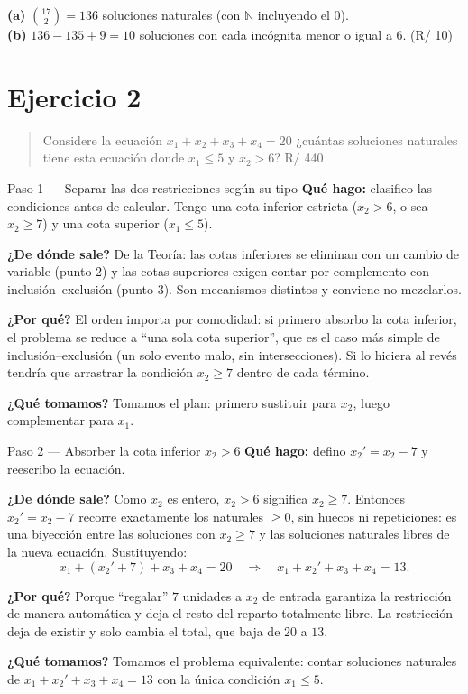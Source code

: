 \documentclass[11pt]{article}
\begin{document}
\begin{resp}
\textbf{(a)} $\binom{17}{2}=136$ soluciones naturales (con $\mathbb{N}$ incluyendo el $0$).\\
\textbf{(b)} $136-135+9=10$ soluciones con cada incógnita menor o igual a $6$. \hfill (R/ 10)
\end{resp}

\section*{Ejercicio 2}

\begin{quote}
Considere la ecuación $x_1+x_2+x_3+x_4=20$ ¿cuántas soluciones naturales tiene esta ecuación donde
$x_1\le 5$ y $x_2>6$? \hfill R/ 440
\end{quote}

\begin{paso}{Paso 1 --- Separar las dos restricciones según su tipo}
\textbf{Qué hago:} clasifico las condiciones antes de calcular. Tengo una cota inferior estricta
($x_2>6$, o sea $x_2\ge 7$) y una cota superior ($x_1\le 5$).

\textbf{¿De dónde sale?} De la Teoría: las cotas inferiores se eliminan con un cambio de variable
(punto 2) y las cotas superiores exigen contar por complemento con inclusión--exclusión (punto 3).
Son mecanismos distintos y conviene no mezclarlos.

\textbf{¿Por qué?} El orden importa por comodidad: si primero absorbo la cota inferior, el problema se
reduce a ``una sola cota superior'', que es el caso más simple de inclusión--exclusión (un solo evento
malo, sin intersecciones). Si lo hiciera al revés tendría que arrastrar la condición $x_2\ge 7$ dentro
de cada término.

\textbf{¿Qué tomamos?} Tomamos el plan: primero sustituir para $x_2$, luego complementar para $x_1$.
\end{paso}

\begin{paso}{Paso 2 --- Absorber la cota inferior $x_2>6$}
\textbf{Qué hago:} defino $x_2'=x_2-7$ y reescribo la ecuación.

\textbf{¿De dónde sale?} Como $x_2$ es entero, $x_2>6$ significa $x_2\ge 7$. Entonces $x_2'=x_2-7$
recorre exactamente los naturales $\ge 0$, sin huecos ni repeticiones: es una biyección entre las
soluciones con $x_2\ge 7$ y las soluciones naturales libres de la nueva ecuación. Sustituyendo:
\[
x_1+(x_2'+7)+x_3+x_4=20 \quad\Longrightarrow\quad x_1+x_2'+x_3+x_4=13.
\]

\textbf{¿Por qué?} Porque ``regalar'' $7$ unidades a $x_2$ de entrada garantiza la restricción de
manera automática y deja el resto del reparto totalmente libre. La restricción deja de existir y solo
cambia el total, que baja de $20$ a $13$.

\textbf{¿Qué tomamos?} Tomamos el problema equivalente: contar soluciones naturales de
$x_1+x_2'+x_3+x_4=13$ con la única condición $x_1\le 5$.
\end{paso}
\end{document}
